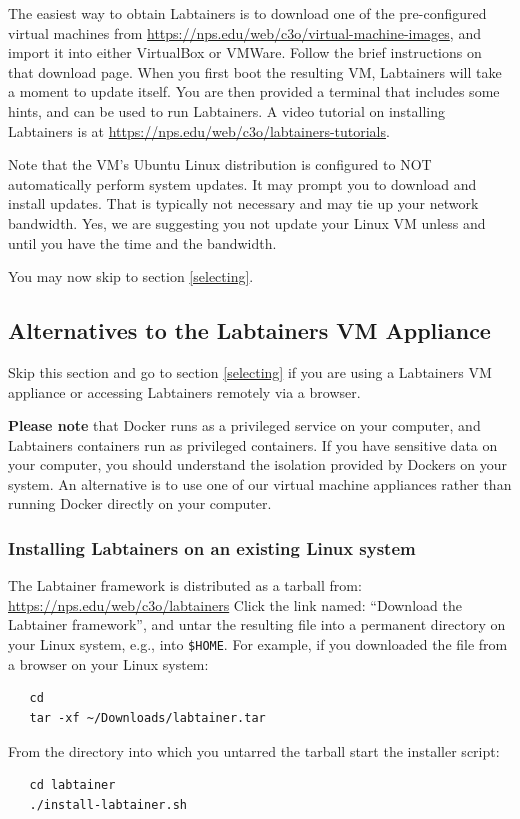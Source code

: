 \documentclass[12pt]{article}
\begin{document}
The easiest way to obtain Labtainers is to download one of the pre-configured virtual machines from
\url{https://nps.edu/web/c3o/virtual-machine-images}, and import it into either VirtualBox or VMWare.
Follow the brief instructions on that download page.  When you first boot the resulting VM,
Labtainers will take a moment to update itself.  You are then provided a terminal that includes
some hints, and can be used to run Labtainers.  A video tutorial on installing Labtainers is at
\url{https://nps.edu/web/c3o/labtainers-tutorials}.

Note that the VM's Ubuntu Linux distribution is configured to NOT
automatically perform system updates.  It may prompt you to download and install updates.  That is typically
not necessary and may tie up your network bandwidth.  Yes, we are suggesting you not update your Linux
VM unless and until you have the time and the bandwidth.

You may now skip to section \ref{selecting}.

\subsection{Alternatives to the Labtainers VM Appliance}
Skip this section and go to section \ref{selecting} if you are using a Labtainers VM appliance or accessing
Labtainers remotely via a browser.

\textbf{Please note} that Docker runs as a privileged service on your computer, and Labtainers containers run as privileged containers.
If you have sensitive data on your computer, you should understand the isolation provided by Dockers on your system.  An alternative
is to use one of our virtual machine appliances rather than running Docker directly on your computer.

\subsubsection{Installing Labtainers on an existing Linux system}
The Labtainer framework is distributed as a tarball from:
\url{https://nps.edu/web/c3o/labtainers}
Click the link named: ``Download the Labtainer framework'', and untar the resulting file into 
a permanent directory on your Linux system, e.g., into {\tt \$HOME}.  For example, if you downloaded the file
from a browser on your Linux system:
\begin{verbatim}
   cd
   tar -xf ~/Downloads/labtainer.tar
\end{verbatim}
From the directory into which you untarred the
tarball start the installer script:
\begin{verbatim}
   cd labtainer
   ./install-labtainer.sh
\end{verbatim}
\end{document}
